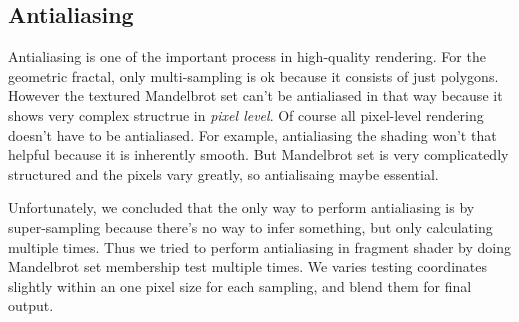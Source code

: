 \documentclass[a4paper]{article}
\begin{document}
\subsection{Antialiasing}
Antialiasing is one of the important process in high-quality rendering.
For the geometric fractal, only multi-sampling is ok because it consists of just polygons.
However the textured Mandelbrot set can't be antialiased in that way because it shows very complex structrue in \textit{pixel level}.
Of course all pixel-level rendering doesn't have to be antialiased.
For example, antialiasing the shading won't that helpful because it is inherently smooth.
But Mandelbrot set is very complicatedly structured and the pixels vary greatly, so antialisaing maybe essential.

Unfortunately, we concluded that the only way to perform antialiasing is by super-sampling because there's no way to infer something, but only calculating multiple times.
Thus we tried to perform antialiasing in fragment shader by doing Mandelbrot set membership test multiple times.
We varies testing coordinates slightly within an one pixel size for each sampling, and blend them for final output.
\end{document}
